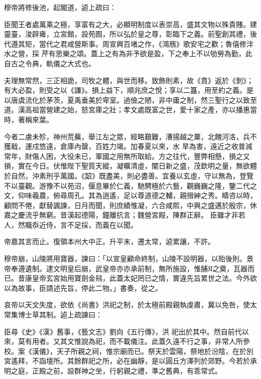\begin{pinyinscope}
 穆帝將修後池，起閣道，逌上疏曰：



 臣聞王者處萬乘之極，享富有之大，必顯明制度以表崇高，盛其文物以殊貴賤。建靈臺，浚辟雍，立宮館，設苑囿，所以弘於皇之尊，彰臨下之義。前聖創其禮，後代遵其矩，當代之君咸營斯事。周宣興百堵之作，《鴻鴈》歌安宅之歡；魯僖修泮水之營，採
 芹有思樂之頌。蓋上之有為非予欲是盈，下之奉上不以劬勞為勤，此自古之令典，軌儀之大式也。



 夫理無常然，三正相詭，司牧之體，與世而移。致飾則素，故《賁》返於《剝》；有大必盈，則受之以《謙》。損上益下，順兆庶之悅；享以二簋，用至約之義。是以唐虞流化於茅茨，夏禹垂美於卑室。過儉之陋，非中庸之制，然三聖行之以致至道。漢高祖當營建之始，怒宮庫之壯；孝文處既富之世，愛十家之產，亦以播惠當時，著稱來葉。



 今者二虜未殄，神州荒蕪，舉江左之眾，經略艱難，漕揚越之粟，北餽河洛，兵不獲戢，運戍悠遠，倉庫內罄，百姓力竭。加春夏以來，水
 旱為害，遠近之收普減常年，財傷人困，大役未已，軍國之用無所取給。方之往代，豐弊相懸，損之又損，實在今日。伏惟陛下聖質天縱，凝曠清虛，闡日新之盛，茂欽明之量，無欲體於自然，沖素刑乎萬國。《韶》既盡美，則必盡善。宜養以玄虛，守以無為，登覽不以臺觀。游豫不以苑沼，偃息畢於仁義，馳騁極於六藝，觀巍巍之隆，鑒二代之文，仰味羲農，俯尋周孔。其為逍遙，足以尊道德之輔，親搢紳之秀。疇咨以時，顧問不倦，獻替諷諫，日月而聞，則庶績惟凝，六合咸熙，中興之盛邁於殷宗，休嘉之慶流乎無窮。昔漢起德陽，鐘離抗言；魏營宮殿，陳群正辭。
 臣雖才非若人，然職忝近侍，言不足採，而義在以聞。



 帝嘉其言而止。復領本州大中正。升平末，遷太常，逌累讓，不許。



 穆帝崩，山陵將用寶器，諫曰：「以宣皇顧命終制，山陵不設明器，以貽後則。景帝奉遵遺制。逮文明皇后崩，武皇帝亦亦承前制，無所施設，惟脯Я之奠，瓦器而已。昔康皇帝玄宮始用寶劍金舄，此蓋太妃罔已之情，實違先旨累世之法。今外欲以為故事，臣請述先旨，停此二物。」書奏，從之。



 哀帝以天文失度，欲依《尚書》洪祀之制，於太極前殿親執虔肅，冀以免咎，使太常集博士草其制。逌上疏諫曰：



 臣尋《史》《漢》舊事，《藝文志》劉向《五行傳》，洪
 祀出於其中。然自前代以來，莫有用者。又其文惟說為祀，而不載儀注。此蓋久遠不行之事，非常人所參校。案《漢儀》，天子所親之祠，惟宗廟而已。祭天於雲陽，祭地於汾陰，在於別宮遙拜，不詣壇所。其餘群祀之所，必在幽靜，是以圓丘方澤列於郊野。今若於承明之庭，正殿之前，設群神之坐，行躬親之禮，準之舊典，有乖常式。




\end{pinyinscope}
